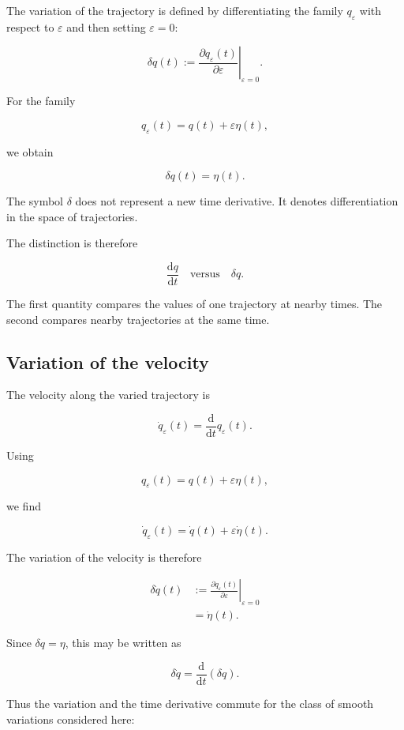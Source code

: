The variation of the trajectory is defined by differentiating the family \(q_{\varepsilon}\) with respect to \(\varepsilon\) and then setting \(\varepsilon=0\):

\[
\delta q(t)
:=
\left.
\frac{\partial q_{\varepsilon}(t)}{\partial\varepsilon}
\right|_{\varepsilon=0}.
\]

For the family

\[
q_{\varepsilon}(t)=q(t)+\varepsilon\eta(t),
\]

we obtain

\[
\boxed{
\delta q(t)=\eta(t)
}.
\]

The symbol \(\delta\) does not represent a new time derivative. It denotes differentiation in the space of trajectories.

The distinction is therefore

\[
\frac{\mathrm{d}q}{\mathrm{d}t}
\quad\text{versus}\quad
\delta q.
\]

The first quantity compares the values of one trajectory at nearby times. The second compares nearby trajectories at the same time.

\subsection{Variation of the velocity}

The velocity along the varied trajectory is

\[
\dot q_{\varepsilon}(t)
=
\frac{\mathrm{d}}{\mathrm{d}t}
q_{\varepsilon}(t).
\]

Using

\[
q_{\varepsilon}(t)=q(t)+\varepsilon\eta(t),
\]

we find

\[
\dot q_{\varepsilon}(t)
=
\dot q(t)+\varepsilon\dot\eta(t).
\]

The variation of the velocity is therefore

\[
\begin{aligned}
\delta\dot q(t)
&:=
\left.
\frac{\partial\dot q_{\varepsilon}(t)}{\partial\varepsilon}
\right|_{\varepsilon=0}\\
&=
\dot\eta(t).
\end{aligned}
\]

Since \(\delta q=\eta\), this may be written as

\[
\boxed{
\delta\dot q
=
\frac{\mathrm{d}}{\mathrm{d}t}(\delta q)
}.
\]

Thus the variation and the time derivative commute for the class of smooth variations considered here:

